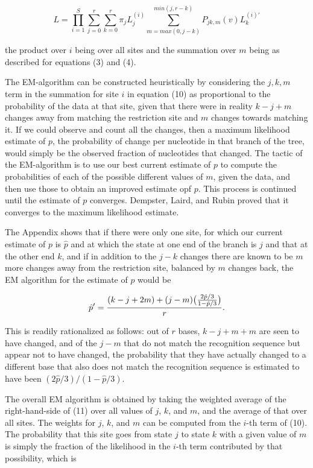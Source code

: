 \begin{equation} %
       L    =    \prod\limits_{i=1}^S \sum_{j=0}^r \sum_{k=0}^r \pi_j L_j^{(i)} \sum_{m=max(0,j-k)}^{min(j, r-k)}
 P_{jk,m}(v) L_k^{(i)'}
\end{equation}

the product over $i$ being over all sites and the summation over $m$ being as
described for equations (3) and (4).

The EM-algorithm can be constructed heuristically by considering the $j,k,m$
term in the summation for site $i$ in equation (10) as proportional to the
probability of the data at that site, given that there were in reality $k-j+m$
changes away from matching the restriction site and $m$ changes towards
matching it.  If we could observe and count all the changes, then a maximum
likelihood estimate of $p$, the probability of change per nucleotide in that
branch of the
tree, would simply be the observed fraction of nucleotides that changed.
The tactic of the EM-algorithm is to use our best current estimate of $p$ to
compute the probabilities of each of the possible different values of $m$,
given the data, and then use those to obtain an improved estimate opf $p$.  This
process is continued until the estimate of $p$ converges.  Dempster, Laird,
and Rubin proved that it converges to the maximum likelihood estimate.

The Appendix shows that if there were only one site, for which our current
estimate of $p$ is
${\hat p}$ and at which the state at one end of the branch is $j$ and that at the
other end $k$, and if in addition to the $j-k$ changes there are known to
be $m$ more changes away from the restriction site, balanced by $m$ changes
back, the EM algorithm for the estimate of $p$ would be

\begin{equation} %
       {\hat p}'  =  {{(k - j + 2m) + (j - m) \bigl({{2{\hat p}/3} \over {1-{\hat p}/3}} \bigr) } \over r}.
\end{equation}

This is readily rationalized as follows: out of $r$ bases, $k-j+m+m$ are seen 
to have changed, and of the $j-m$ that do not match the recognition sequence
but appear not to have changed, the probability that they have actually
changed to a different base that also does not match the recognition sequence
is estimated to have been $(2{\hat p}/3) \bigl/ (1-{\hat p}/3)$.

The overall EM algorithm is
obtained by taking the weighted average of the right-hand-side of (11) over all 
values of $j$, $k$, and $m$, and the average of that over all sites.  The
weights for $j$, $k$, and $m$ can be computed from the $i$-th term of (10).
The probability that this site goes from state $j$ to state $k$ with a given
value of $m$ is simply the fraction of the likelihood in the $i$-th term
contributed by that possibility, which is

